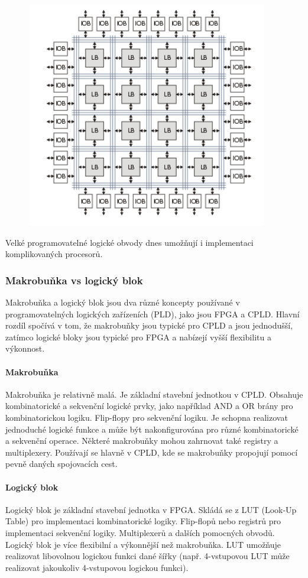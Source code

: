 \begin{figure}[h]
    \centering
    \includegraphics[scale=0.5]{sections/3_pld_npld/images/Screenshot 2024-08-22 173804.png}
\end{figure}

Velké programovatelné logické obvody dnes umožňují i implementaci komplikovaných procesorů.

\subsubsection{Makrobuňka vs logický blok}
Makrobuňka a logický blok jsou dva různé koncepty používané v programovatelných logických zařízeních (PLD), jako jsou FPGA a CPLD. Hlavní rozdíl spočívá v tom, že makrobuňky jsou typické pro CPLD a jsou jednodušší, zatímco logické bloky jsou typické pro FPGA a nabízejí vyšší flexibilitu a výkonnost.

\paragraph{Makrobuňka}
Makrobuňka je relativně malá. Je základní stavební jednotkou v CPLD. Obsahuje kombinatorické a sekvenční logické prvky, jako například AND a OR brány pro kombinatorickou logiku. Flip-flopy pro sekvenční logiku. Je schopna realizovat jednoduché logické funkce a může být nakonfigurována pro různé kombinatorické a sekvenční operace. Některé makrobuňky mohou zahrnovat také registry a multiplexery. Používají se hlavně v CPLD, kde se makrobuňky propojují pomocí pevně daných spojovacích cest.
\paragraph{Logický blok}
Logický blok je základní stavební jednotka v FPGA. Skládá se z LUT (Look-Up Table) pro implementaci kombinatorické logiky. Flip-flopů nebo registrů pro implementaci sekvenční logiky. Multiplexerů a dalších pomocných obvodů. Logický blok je více flexibilní a výkonnější než makrobuňka. LUT umožňuje realizovat libovolnou logickou funkci dané šířky (např. 4-vstupovou LUT může realizovat jakoukoliv 4-vstupovou logickou funkci).
